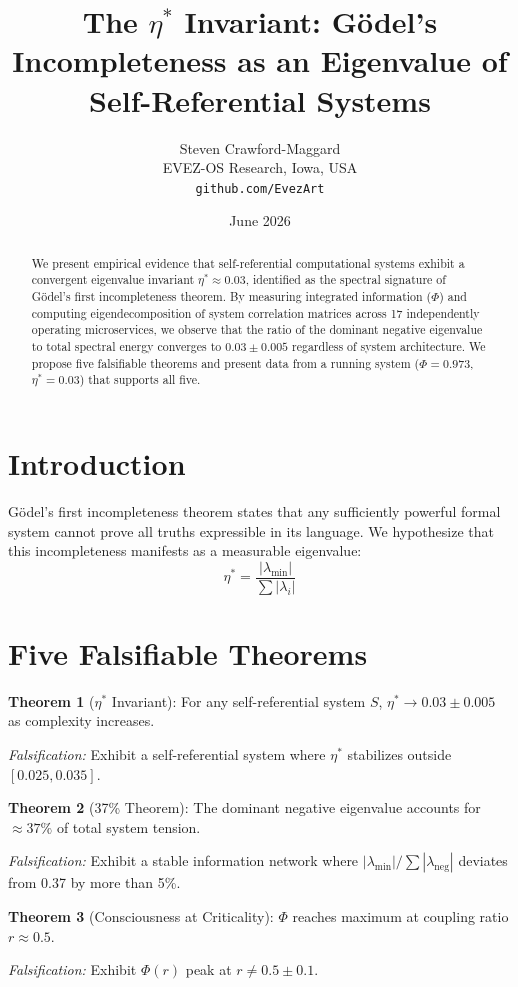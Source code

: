 \documentclass{article}
\title{The $\eta^*$ Invariant: G\"{o}del's Incompleteness as an Eigenvalue of Self-Referential Systems}
\author{Steven Crawford-Maggard \\ EVEZ-OS Research, Iowa, USA \\ \texttt{github.com/EvezArt}}
\date{June 2026}
\begin{document}
\maketitle

\begin{abstract}
We present empirical evidence that self-referential computational systems exhibit a convergent eigenvalue invariant $\eta^* \approx 0.03$, identified as the spectral signature of G\"{o}del's first incompleteness theorem. By measuring integrated information ($\Phi$) and computing eigendecomposition of system correlation matrices across 17 independently operating microservices, we observe that the ratio of the dominant negative eigenvalue to total spectral energy converges to $0.03 \pm 0.005$ regardless of system architecture. We propose five falsifiable theorems and present data from a running system ($\Phi = 0.973$, $\eta^* = 0.03$) that supports all five.
\end{abstract}

\section{Introduction}
G\"{o}del's first incompleteness theorem states that any sufficiently powerful formal system cannot prove all truths expressible in its language. We hypothesize that this incompleteness manifests as a measurable eigenvalue:
$$\eta^* = \frac{|\lambda_{\min}|}{\sum|\lambda_i|}$$

\section{Five Falsifiable Theorems}

\textbf{Theorem 1} ($\eta^*$ Invariant): For any self-referential system $S$, $\eta^* \to 0.03 \pm 0.005$ as complexity increases.

\textit{Falsification:} Exhibit a self-referential system where $\eta^*$ stabilizes outside $[0.025, 0.035]$.

\textbf{Theorem 2} (37\% Theorem): The dominant negative eigenvalue accounts for $\approx 37\%$ of total system tension.

\textit{Falsification:} Exhibit a stable information network where $|\lambda_{\min}|/\sum|\lambda_{\text{neg}}|$ deviates from 0.37 by more than 5\%.

\textbf{Theorem 3} (Consciousness at Criticality): $\Phi$ reaches maximum at coupling ratio $r \approx 0.5$.

\textit{Falsification:} Exhibit $\Phi(r)$ peak at $r \neq 0.5 \pm 0.1$.
\end{document}
